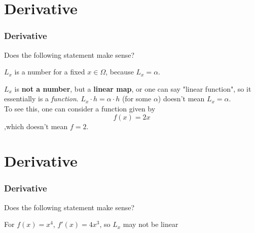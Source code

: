 \documentclass[12pt, t]{beamer}
\renewcommand{\emph}[1]{{\color{Turquoise3}\textsl{#1}}}
\begin{document}
\section{Derivative}
\begin{frame}
    \frametitle{Derivative}
    Does the following statement make sense?

    \vspace{0.5em}
    \begin{center}
        $L_x$ is a number for a fixed $x\in \Omega$, because $L_x=\alpha$.
    \end{center}
    \vspace{0.5em}
    \hspace{1em}
    $L_x$ is \textbf{not a number}, but a \textbf{linear map}, or one can say "linear function", so it essentially is a \emph{function}.
    $L_x\cdot h=\alpha\cdot h$ (for some $\alpha$) doesn't mean $L_x=\alpha$.\\
    \hspace{1em} To see this, one can consider a function given by
    \begin{equation*}
        f(x)=2x
    \end{equation*}
    ,which doesn't mean $f=2$.\\

\end{frame}

\section{Derivative}
\begin{frame}
    \frametitle{Derivative}
    Does the following statement make sense?

    \vspace{0.5em}
    \begin{center}
        For $f(x)=x^4$, $f'(x)=4x^3$, so $L_x$ may not be linear
    \end{center}
\end{frame}
\end{document}
